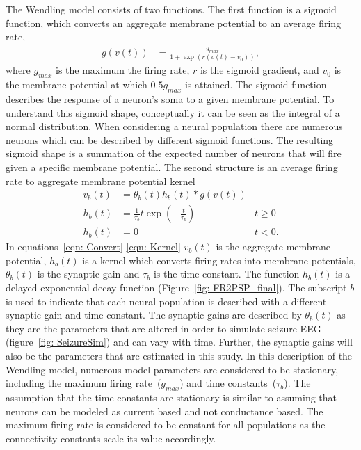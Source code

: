 The Wendling model consists of two functions. The first function is a sigmoid function, which converts an aggregate membrane potential to an average firing rate,\begin{align}%
\label{eqn: Sigmoid}
g(v(t)) &= \frac{g_{max}}{1+\exp(r(v(t)-v_{0}))}, \end{align} where $g_{max}$ is the maximum the firing rate, $r$ is the sigmoid gradient, and $v_{0}$ is the membrane potential at which $0.5g_{max}$ is attained. The sigmoid function describes the response of a neuron's soma to a given membrane potential. To understand this sigmoid shape, conceptually it can be seen as the integral of a normal distribution. When considering a neural population there are numerous neurons which can be described by different sigmoid functions. The resulting sigmoid shape is a summation of the expected number of neurons that will fire given a specific membrane potential. %
The second structure is an average firing rate to aggregate membrane potential kernel \begin{align} %
\label{eqn: Convert}
v_{b}(t) &= \theta_{b}(t)h_{b}(t)*g(v(t))\\
\label{eqn: Kernel} 
h_{b}(t) &= \frac{1}{\tau_{b}}t\exp\left(-\frac{t}{\tau_{b}}\right) & t \geq 0\\
h_{b}(t) & = 0 & t <0. \end{align} In equations~\ref{eqn: Convert}-\ref{eqn: Kernel} $v_{b}(t)$ is the aggregate membrane potential, $h_{b}(t)$ is a kernel which converts firing rates into membrane potentials, $\theta_{b}(t)$ is the synaptic gain and $\tau_{b}$ is the time constant. The function $h_{b}(t)$ is a delayed exponential decay function (Figure~\ref{fig: FR2PSP_final}). The subscript $b$ is used to indicate that each neural population is described with a different synaptic gain and time constant. The synaptic gains are described by $\theta_{b}(t)$ as they are the parameters that are altered in order to simulate seizure EEG (figure~\ref{fig: SeizureSim}) and can vary with time. Further, the synaptic gains will also be the parameters that are estimated in this study. In this description of the Wendling model, numerous model parameters are considered to be stationary, including the maximum firing rate~($g_{max}$) and time constants~($\tau_{b}$). The assumption that the time constants are stationary is similar to assuming that neurons can be modeled as current based and not conductance based. The maximum firing rate is considered to be constant for all populations as the connectivity constants scale its value accordingly. 

